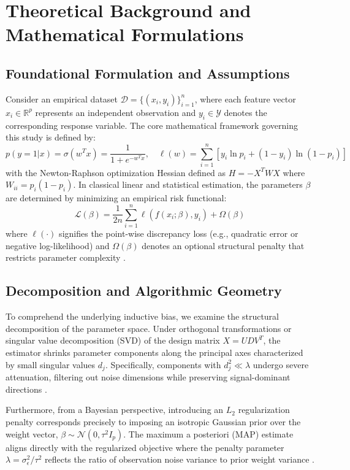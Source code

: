 \section{Theoretical Background and Mathematical Formulations}

\subsection{Foundational Formulation and Assumptions}
Consider an empirical dataset $\mathcal{D} = \{(x_i, y_i)\}_{i=1}^n$, where each feature vector $x_i \in \mathbb{R}^p$ represents an independent observation and $y_i \in \mathcal{Y}$ denotes the corresponding response variable. The core mathematical framework governing this study is defined by:
\begin{equation}
  p(y=1|x) = \sigma(w^T x) = \frac{1}{1 + e^{-w^T x}}, \quad \ell(w) = \sum_{i=1}^n \left[ y_i \ln p_i + (1 - y_i) \ln(1 - p_i) \right]
\label{eq:core_math}
\end{equation}
with the Newton-Raphson optimization Hessian defined as $H = -X^T W X$ where $W_{ii} = p_i (1 - p_i)$.
In classical linear and statistical estimation, the parameters $\beta$ are determined by minimizing an empirical risk functional:
\begin{equation}
  \mathcal{L}(\beta) = \frac{1}{2n} \sum_{i=1}^n \ell(f(x_i; \beta), y_i) + \Omega(\beta)
\end{equation}
where $\ell(\cdot)$ signifies the point-wise discrepancy loss (e.g., quadratic error or negative log-likelihood) and $\Omega(\beta)$ denotes an optional structural penalty that restricts parameter complexity \cite{bishop2006}.

\subsection{Decomposition and Algorithmic Geometry}
To comprehend the underlying inductive bias, we examine the structural decomposition of the parameter space. Under orthogonal transformations or singular value decomposition (SVD) of the design matrix $X = U D V^T$, the estimator shrinks parameter components along the principal axes characterized by small singular values $d_j$. Specifically, components with $d_j^2 \ll \lambda$ undergo severe attenuation, filtering out noise dimensions while preserving signal-dominant directions \cite{hoerl1970}.

Furthermore, from a Bayesian perspective, introducing an $L_2$ regularization penalty corresponds precisely to imposing an isotropic Gaussian prior over the weight vector, $\beta \sim \mathcal{N}(0, \tau^2 I_p)$. The maximum a posteriori (MAP) estimate aligns directly with the regularized objective where the penalty parameter $\lambda = \sigma_\epsilon^2 / \tau^2$ reflects the ratio of observation noise variance to prior weight variance \cite{murphy2012}.

